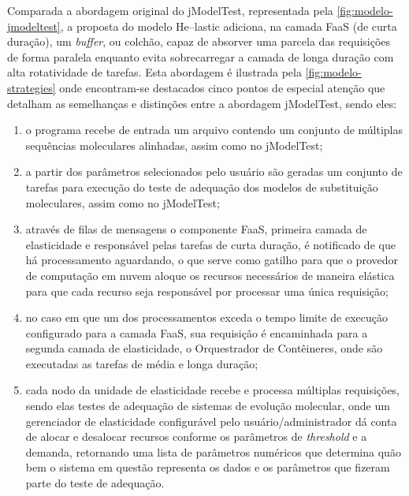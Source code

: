 \documentclass[english,brazilian]{UNISINOSmonografia} %
\begin{document}
Comparada a abordagem original do jModelTest, representada pela \autoref{fig:modelo-jmodeltest}, a proposta do modelo \textsf{He}--lastic adiciona, na camada FaaS (de curta duração), um \textit{buffer}, ou colchão, capaz de absorver uma parcela das requisições de forma paralela enquanto evita sobrecarregar a camada de longa duração com alta rotatividade de tarefas.
Esta abordagem é ilustrada pela \autoref{fig:modelo-strategies} onde encontram-se destacados cinco pontos de especial atenção que detalham as semelhanças e distinções entre a abordagem jModelTest, sendo eles:

\begin{enumerate}[label={\arabic*)}]

	\item o programa recebe de entrada um arquivo contendo um conjunto de múltiplas sequências moleculares alinhadas, assim como no jModelTest;
	
	\item a partir dos parâmetros selecionados pelo usuário são geradas um conjunto de tarefas para execução do teste de adequação dos modelos de substituição moleculares, assim como no jModelTest;
	
	\item através de filas de mensagens o componente FaaS, primeira camada de elasticidade e responsável pelas tarefas de curta duração, é notificado de que há processamento aguardando, o que serve como gatilho para que o provedor de computação em nuvem aloque os recursos necessários de maneira elástica para que cada recurso seja responsável por processar uma única requisição;
	
	\item no caso em que um dos processamentos exceda o tempo limite de execução configurado para a camada FaaS, sua requisição é encaminhada para a segunda camada de elasticidade, o Orquestrador de Contêineres, onde são executadas as tarefas de média e longa duração;
	
	\item cada nodo da unidade de elasticidade recebe e processa múltiplas requisições, sendo elas testes de adequação de sistemas de evolução molecular, onde um gerenciador de elasticidade configurável pelo usuário/administrador dá conta de alocar e desalocar recursos conforme os parâmetros de \textit{threshold} e a demanda, retornando uma lista de parâmetros numéricos que determina quão bem o sistema em questão representa os dados e os parâmetros que fizeram parte do teste de adequação.

\end{enumerate}
\end{document}
